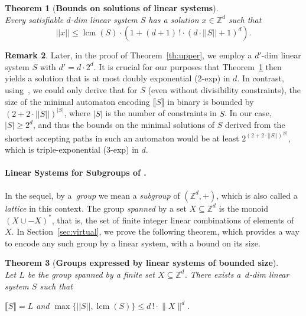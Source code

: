 \documentclass[11pt,a4paper]{amsart}
\newcommand{\nnorm}[1]{||#1||}
\newcommand{\Zset}{\mathbb{Z}}
\newcommand{\setZ}{\Zset}
\newcommand{\norm}[2]{\lVert #2 \rVert_{#1}}
\newcommand{\sem}[1]{\llbracket#1\rrbracket}
\newcommand{\mlcm}[1]{\operatorname{lcm}(#1)}
\theoremstyle{plain}
\newtheorem{thm}{Theorem}[section]
\theoremstyle{definition}
\newtheorem{rem}[thm]{Remark}
\theoremstyle{defC}
\theoremstyle{thmC}
\begin{document}
\begin{thm}[\textbf{Bounds on solutions of linear systems}]\label{thm:smallsolutions}
\hfill\\
	Every satisfiable $d$-dim linear system $S$ 
 has a solution $x\in\setZ^d$ such that
	\[\nnorm{x}\leq
		\mlcm{S} \cdot \left(1+ (d+1)\,!\cdot (d\cdot
		\nnorm{S}+1)^{d}\right).\]
\end{thm}

\begin{rem}
Later, in
the proof of Theorem~\ref{th:upper}, we employ a $d'$-dim linear system $S$
with $d'=d\cdot2^d$. 
It is crucial for our purposes that Theorem~\ref{thm:smallsolutions} then yields a solution that is
	at most doubly exponential (2-exp) in $d$.  
In contrast, using~\cite[Theorem 3.12]{DBLP:journals/tocl/Klaedtke08},
	we could only derive
	that for $S$ (even without divisibility constraints),  
the size of the minimal automaton encoding $\sem{S}$ 
in binary is bounded by $(2+2\cdot\nnorm{S})^{|S|}$,
where $|S|$ is the number of constraints in $S$. In our case, $|S|\geq
2^d$, and thus the bounds on the minimal solutions of $S$ derived from the
shortest accepting paths in such an automaton would be at least
$2^{(2+2\cdot\nnorm{S})^{|S|}}$,
	which is triple-exponential (3-exp) in $d$.
\end{rem}



\paragraph{Linear Systems for Subgroups of \bm{$\setZ^d$}.}
In the sequel, by a~\emph{group} we mean 
a \emph{subgroup} of $(\setZ^d,+)$,
which is also called a \emph{lattice} in this context.
The group \emph{spanned} by a set $X\subseteq \setZ^d$ is 
the monoid $(X\cup-X)^*$, that is, the set of finite integer linear
combinations of elements of $X$. 
In Section~\ref{sec:virtual}, we prove the following theorem, which
provides a way to encode any such group by a linear system, with a
bound on its  size.




\begin{thm}[\textbf{Groups expressed by linear systems of bounded size}]\label{thm:virtual2system}
\hfill\\	
Let $L$ be the group spanned by a finite set $X\subseteq
\setZ^d$. There exists a~$d$-dim linear system $S$ such that
\begin{center}
$\sem{S}=L$ and $\max\{\nnorm{S},\mlcm{S}\}\leq d\,!\cdot
	\norm{}{X}^d$.
\end{center}
\end{thm}
\end{document}
